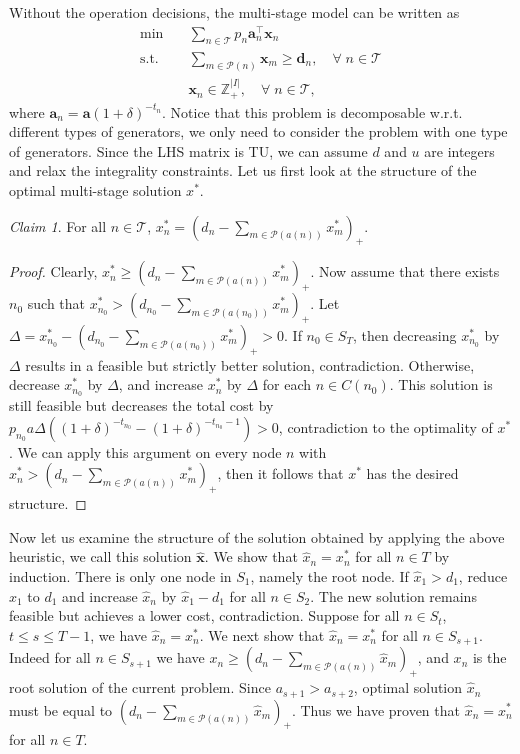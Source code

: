 \documentclass[10pt]{article}
\theoremstyle{plain}
\theoremstyle{definition}
\theoremstyle{remark}
\newtheorem*{claim}{Claim}
\newcommand{\tr}{^{\top}}
\newcommand{\subjectto}{\text{s.t.}}
\newcommand{\ba}{\mathbf{a}}
\newcommand{\bd}{\mathbf{d}}
\newcommand{\bx}{\mathbf{x}}
\newcommand{\bu}{\mathbf{u}}
\newcommand{\cP}{\mathcal{P}}
\newcommand{\T}{\mathcal{T}}
\newcommand{\Z}{\mathbb{Z}}
\begin{document}
Without the operation decisions, the multi-stage model can be written as
\begin{align*}
\min \quad & \sum_{n\in \T} p_n\ba_n\tr \bx_n\\
\subjectto \quad & \sum_{m\in\cP(n)} \bx_m \ge \bd_n, \quad \forall\; n\in \T\\
& \bx_n\in \Z_+^{|I|}, \quad \forall\; n\in \T,
\end{align*}
where $\ba_n = \ba(1+\delta)^{-t_n}$. Notice that this problem is decomposable w.r.t.
different types of generators, we only need to consider the problem with one type of generators.
Since the LHS matrix is TU, we can assume $d$ and $u$ are integers and relax the integrality constraints.
Let us first look at the structure of the optimal multi-stage solution $x^*$.
\begin{claim}
For all $n \in \T$, $x^*_n = (d_n - \sum_{m\in \cP(a(n))}{x^*_m})_+$.
\end{claim}
\begin{proof}
Clearly, $x^*_n \ge (d_n - \sum_{m\in \cP(a(n))}{x^*_m})_+$.
Now assume that there exists $n_0$ such that $x^*_{n_0} > (d_{n_0} - \sum_{m\in \cP(a(n_0))}{x^*_m})_+$.
Let $\Delta = x^*_{n_0} - (d_{n_0} - \sum_{m\in \cP(a(n_0))}{x^*_m})_+>0$.
If $n_0\in S_{T}$, then decreasing $x^*_{n_0}$ by $\Delta$ results in a feasible but strictly better solution, contradiction.
Otherwise, decrease $x^*_{n_0}$ by $\Delta$, and increase $x^*_{n}$ by $\Delta$ for each $n\in C(n_0)$.
This solution is still feasible but decreases the total cost by $p_{n_0}a\Delta((1+\delta)^{-t_{n_0}} - (1+\delta)^{-t_{n_0}-1})>0$,
contradiction to the optimality of $x^*$.
We can apply this argument on every node $n$ with $x^*_{n} > (d_n - \sum_{m\in \cP(a(n))}{x^*_m})_+$,
then it follows that $x^*$ has the desired structure.
\end{proof}

Now let us examine the structure of the solution obtained by applying the above heuristic, we call this solution $\hat{\bx}$.
We show that $\hat{x}_n = x^*_n$ for all $n\in T$ by induction.
There is only one node in $S_1$, namely the root node. If $\hat{x}_1 > d_1$, reduce $\hat{x}_1$ to $d_1$ and increase
$\hat{x}_n$ by $\hat{x}_1-d_1$ for all $n\in S_2$. The new solution remains feasible but achieves a lower cost, contradiction.
Suppose for all $n\in S_t$, $t\le s\le T-1$, we have $\hat{x}_n = x^*_n$.
We next show that $\hat{x}_n = x^*_n$ for all $n\in S_{s+1}$.
Indeed for all $n\in S_{s+1}$ we have $x_n\ge (d_n - \sum_{m\in \cP(a(n))}\hat{x}_m)_+$,
and $x_n$ is the root solution of the current problem.
Since $a_{s+1}>a_{s+2}$, optimal solution $\hat{x}_n$ must be equal to $(d_n - \sum_{m\in \cP(a(n))}\hat{x}_m)_+$.
Thus we have proven that $\hat{x}_n = x^*_n$ for all $n\in T$.
\end{document}
